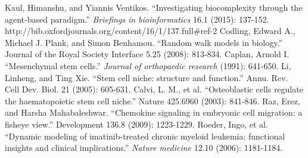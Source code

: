 \documentclass[12pt]{article}
\begin{document}
\newpage

\begin{thebibliography}{9}
  Kaul, Himanshu, and Yiannis Ventikos. ``Investigating biocomplexity through the agent-based paradigm.'' {\itshape Briefings in bioinformatics} 16.1 (2015): 137-152. http://bib.oxfordjournals.org/content/16/1/137.full\#ref-2
  Codling, Edward A., Michael J. Plank, and Simon Benhamou. ``Random walk models in biology.'' Journal of the Royal Society Interface 5.25 (2008): 813-834.
  Caplan, Arnold I. ``Mesenchymal stem cells.'' {\itshape Journal of orthopaedic research} (1991): 641-650.
  Li, Linheng, and Ting Xie. ``Stem cell niche: structure and function.'' Annu. Rev. Cell Dev. Biol. 21 (2005): 605-631.
  Calvi, L. M., et al. ``Osteoblastic cells regulate the haematopoietic stem cell niche.'' Nature 425.6960 (2003): 841-846.
  Raz, Erez, and Harsha Mahabaleshwar. ``Chemokine signaling in embryonic cell migration: a fisheye view.'' Development 136.8 (2009): 1223-1229.
  Roeder, Ingo, et al. ``Dynamic modeling of imatinib-treated chronic myeloid leukemia: functional insights and clinical implications.'' {\itshape Nature medicine} 12.10 (2006): 1181-1184.
\end{thebibliography}

\end{document}
